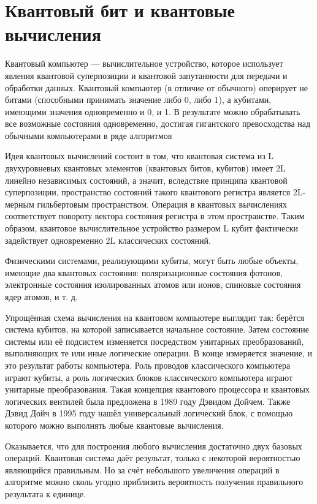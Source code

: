\documentclass[12pt, specialist, subf, substylefile = spbu.rtx]{disser}
\begin{document}
\section{Квантовый бит и квантовые вычисления}

Квантовый компьютер — вычислительное устройство, которое использует явления квантовой суперпозиции и квантовой запутанности для передачи и обработки данных. Квантовый компьютер (в отличие от обычного) оперирует не битами (способными принимать значение либо 0, либо 1), а кубитами, имеющими значения одновременно и 0, и 1. В результате можно обрабатывать все возможные состояния одновременно, достигая гигантского превосходства над обычными компьютерами в ряде алгоритмов

Идея квантовых вычислений состоит в том, что квантовая система из L двухуровневых квантовых элементов (квантовых битов, кубитов) имеет 2L линейно независимых состояний, а значит, вследствие принципа квантовой суперпозиции, пространство состояний такого квантового регистра является 2L-мерным гильбертовым пространством. Операция в квантовых вычислениях соответствует повороту вектора состояния регистра в этом пространстве. Таким образом, квантовое вычислительное устройство размером L кубит фактически задействует одновременно 2L классических состояний.

Физическими системами, реализующими кубиты, могут быть любые объекты, имеющие два квантовых состояния: поляризационные состояния фотонов, электронные состояния изолированных атомов или ионов, спиновые состояния ядер атомов, и т. д.

Упрощённая схема вычисления на квантовом компьютере выглядит так: берётся система кубитов, на которой записывается начальное состояние. Затем состояние системы или её подсистем изменяется посредством унитарных преобразований, выполняющих те или иные логические операции. В конце измеряется значение, и это результат работы компьютера. Роль проводов классического компьютера играют кубиты, а роль логических блоков классического компьютера играют унитарные преобразования. Такая концепция квантового процессора и квантовых логических вентилей была предложена в 1989 году Дэвидом Дойчем. Также Дэвид Дойч в 1995 году нашёл универсальный логический блок, с помощью которого можно выполнять любые квантовые вычисления.

Оказывается, что для построения любого вычисления достаточно двух базовых операций. Квантовая система даёт результат, только с некоторой вероятностью являющийся правильным. Но за счёт небольшого увеличения операций в алгоритме можно сколь угодно приблизить вероятность получения правильного результата к единице.
\end{document}
